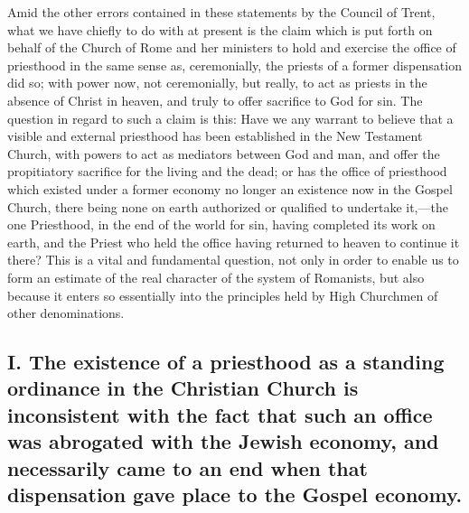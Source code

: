 \documentclass[]{book}
\begin{document}
Amid the other errors contained in these statements by the Council of Trent, what we have chiefly to do with at present is the claim which is put forth on behalf of the Church of Rome and her ministers to hold and exercise the office of priesthood in the same sense as, ceremonially, the priests of a former dispensation did so; with power now, not ceremonially, but really, to act as priests in the absence of Christ in heaven, and truly to offer sacrifice to God for sin. The question in regard to such a claim is this: Have we any warrant to believe that a visible and external priesthood has been established in the New Testament Church, with powers to act as mediators between God and man, and offer the propitiatory sacrifice for the living and the dead; or has the office of priesthood which existed under a former economy no longer an existence now in the Gospel Church, there being none on earth authorized or qualified to undertake it,---the one Priesthood, in the end of the world for sin, having completed its work on earth, and the Priest who held the office having returned to heaven to continue it there? This is a vital and fundamental question, not only in order to enable us to form an estimate of the real character of the system of Romanists, but also because it enters so essentially into the principles held by High Churchmen of other denominations.

\hypertarget{i.-the-existence-of-a-priesthood-as-a-standing-ordinance-in-the-christian-church-is-inconsistent-with-the-fact-that-such-an-office-was-abrogated-with-the-jewish-economy-and-necessarily-came-to-an-end-when-that-dispensation-gave-place-to-the-gospel-economy.}{%
\subsection{I. The existence of a priesthood as a standing ordinance in the Christian Church is inconsistent with the fact that such an office was abrogated with the Jewish economy, and necessarily came to an end when that dispensation gave place to the Gospel economy.}\label{i.-the-existence-of-a-priesthood-as-a-standing-ordinance-in-the-christian-church-is-inconsistent-with-the-fact-that-such-an-office-was-abrogated-with-the-jewish-economy-and-necessarily-came-to-an-end-when-that-dispensation-gave-place-to-the-gospel-economy.}}
\end{document}
